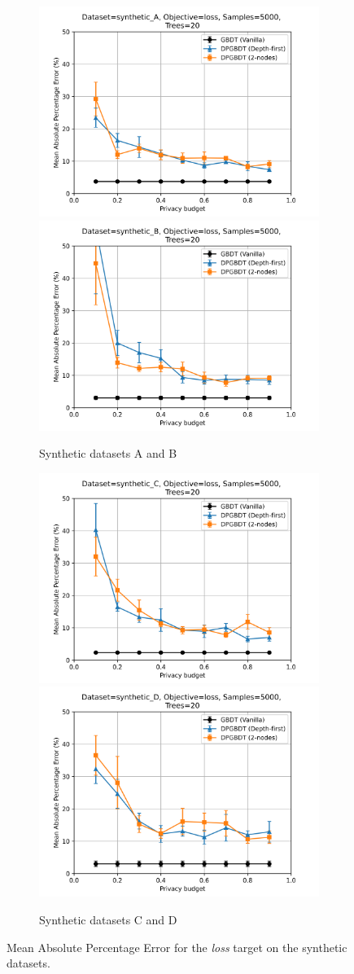\begin{figure}[h!]
  \begin{subfigure}{\linewidth}
  \includegraphics[width=.5\linewidth]{images/evaluation/synthetic_A_loss_5000.png}\hfill
  \includegraphics[width=.5\linewidth]{images/evaluation/synthetic_B_loss_5000.png}
  \caption{Synthetic datasets A and B}
  \end{subfigure}\par\medskip
  \begin{subfigure}{\linewidth}
  \includegraphics[width=.5\linewidth]{images/evaluation/synthetic_C_loss_5000.png}\hfill
  \includegraphics[width=.5\linewidth]{images/evaluation/synthetic_D_loss_5000.png}
  \caption{Synthetic datasets C and D}
  \end{subfigure}
  \caption{\label{fig:results_synthetic_loss}Mean Absolute Percentage Error for the \textit{loss} target on the synthetic datasets.}
\end{figure}

